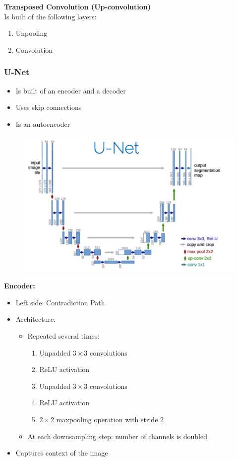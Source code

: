 \documentclass[10pt,a4paper]{article}
\newcommand{\props}{$\circ$}
\newcommand{\iprops}{\item[\props]}
\begin{document}
\textbf{Transposed Convolution (Up-convolution)} \\
Is built of the following layers:
\begin{enumerate}
	\item Unpooling
	\item Convolution
\end{enumerate}

\subsubsection{U-Net}
\begin{itemize}
	\item Is built of an encoder and a decoder
	\iprops Uses skip connections
	\iprops Is an autoencoder
\end{itemize}
\begin{figure}[H]
	\includegraphics[width=0.7\columnwidth]{figures/u-net.png}
\end{figure}

\textbf{Encoder:}
\begin{itemize}
	\item Left side: Contradiction Path
	\item Architecture:
	\begin{itemize}
		\item Repeated several times:
		\begin{enumerate}
			\item Unpadded $3 \times 3$ convolutions
			\item ReLU activation
			\item Unpadded $3 \times 3$ convolutions
			\item ReLU activation
			\item $2 \times 2$ maxpooling operation with stride 2
		\end{enumerate}
		\item At each downsampling step: number of channels is doubled		
	\end{itemize}
	\iprops Captures context of the image
\end{itemize} ~\\
\end{document}

